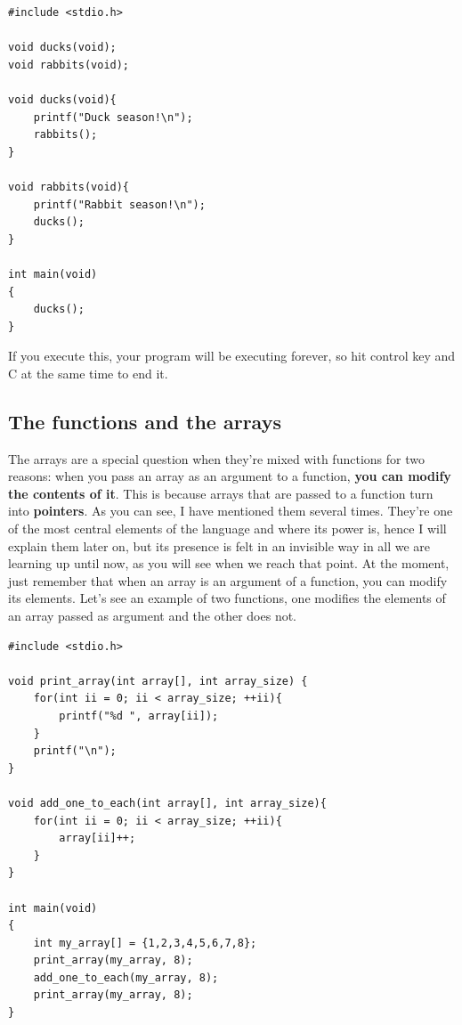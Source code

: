 \documentclass[a4paper]{article}
\begin{document}
\noindent
\begin{minipage}[H]{\linewidth}
\mbox{}
\begin{lstlisting}[style=C, label={lst:cyclicFunctions},
caption={Declaration separated of definition}]
#include <stdio.h>

void ducks(void);
void rabbits(void);

void ducks(void){
    printf("Duck season!\n");
    rabbits();
}

void rabbits(void){
    printf("Rabbit season!\n");
    ducks();
}

int main(void)
{
    ducks();
}
\end{lstlisting}
\end{minipage}

If you execute this, your program will be executing forever, so hit control key
and C at the same time to end it.

\subsection{The functions and the arrays}
The arrays are a special question when they're mixed with functions for two
reasons: when you pass an array as an argument to a function, \textbf{you can
modify the contents of it}. This is because arrays that are passed to a function
turn into \textbf{pointers}. As you can see, I have mentioned them several
times. They're one of the most central elements of the language and where its
power is, hence I will explain them later on, but its presence is felt
in an invisible way in all we are learning up until now, as you will see when we
reach that point. At the moment, just remember that when an array is an argument
of a function, you can modify its elements. Let's see an example of two
functions, one modifies the elements of an array passed as argument and the
other does not.

\noindent
\begin{minipage}[H]{\linewidth}
\mbox{}
\begin{lstlisting}[style=C, label={lst:arraysAndFunctions},
caption={Array use with functions}]
#include <stdio.h>

void print_array(int array[], int array_size) {
    for(int ii = 0; ii < array_size; ++ii){
        printf("%d ", array[ii]);
    }
    printf("\n");
}

void add_one_to_each(int array[], int array_size){
    for(int ii = 0; ii < array_size; ++ii){
        array[ii]++;
    }
}

int main(void)
{
    int my_array[] = {1,2,3,4,5,6,7,8};
    print_array(my_array, 8);
    add_one_to_each(my_array, 8);
    print_array(my_array, 8);
}
\end{lstlisting}
\end{minipage}
\end{document}
